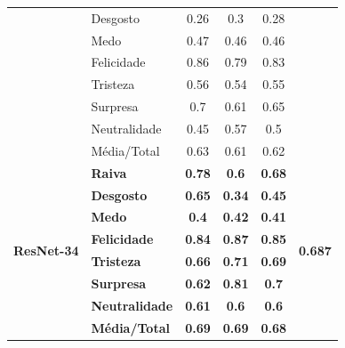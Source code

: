 \begin{table}[]
\begin{tabular}{llcccc}
                                       & Desgosto              & 0.26              & 0.3                & 0.28              &                                 \\
                                       & Medo                  & 0.47              & 0.46               & 0.46              &                                 \\
                                       & Felicidade            & 0.86              & 0.79               & 0.83              &                                 \\
                                       & Tristeza              & 0.56              & 0.54               & 0.55              &                                 \\
                                       & Surpresa              & 0.7               & 0.61               & 0.65              &                                 \\
                                       & Neutralidade          & 0.45              & 0.57               & 0.5               &                                 \\
                                       & Média/Total           & 0.63              & 0.61               & 0.62              &                                 \\ \hline
\multirow{8}{*}{\textbf{ResNet-34}} & \textbf{Raiva}        & \textbf{0.78}     & \textbf{0.6}       & \textbf{0.68}     & \multirow{8}{*}{\textbf{0.687}} \\
                                       & \textbf{Desgosto}     & \textbf{0.65}     & \textbf{0.34}      & \textbf{0.45}     &                                 \\
                                       & \textbf{Medo}         & \textbf{0.4}      & \textbf{0.42}      & \textbf{0.41}     &                                 \\
                                       & \textbf{Felicidade}   & \textbf{0.84}     & \textbf{0.87}      & \textbf{0.85}     &                                 \\
                                       & \textbf{Tristeza}     & \textbf{0.66}     & \textbf{0.71}      & \textbf{0.69}     &                                 \\
                                       & \textbf{Surpresa}     & \textbf{0.62}     & \textbf{0.81}      & \textbf{0.7}      &                                 \\
                                       & \textbf{Neutralidade} & \textbf{0.61}     & \textbf{0.6}       & \textbf{0.6}      &                                 \\
                                       & \textbf{Média/Total}  & \textbf{0.69}     & \textbf{0.69}      & \textbf{0.68}     &                                 \\ \hline
\end{tabular}
\end{table}


